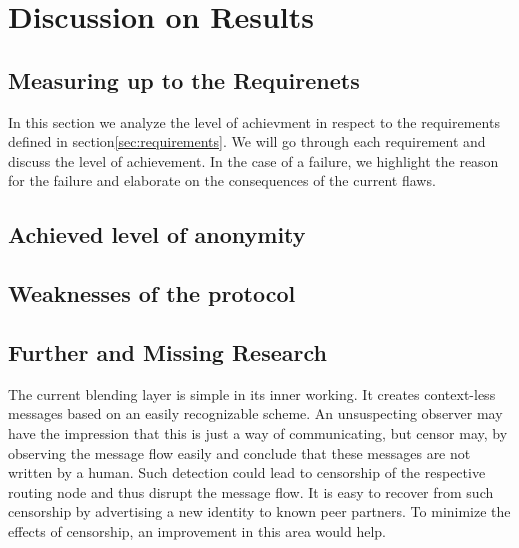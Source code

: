 \part{Discussion on Results}

\chapter{Measuring up to the Requirenets\label{sec:reqDiscussion}}
In this section we analyze the level of achievment in respect to the requirements defined in section\ref{sec:requirements}. We will go through each requirement and discuss the level of achievement. In the case of a failure, we highlight the reason for the failure and elaborate on the consequences of the current flaws.



\chapter{Achieved level of anonymity}

\chapter{Weaknesses of the protocol}

\chapter{Further and Missing Research}
The current blending layer is simple in its inner working. It creates context-less messages based on an easily recognizable scheme. An unsuspecting observer may have the impression that this is just a way of communicating, but censor may, by observing the message flow easily and conclude that these messages are not written by a human. Such detection could lead to censorship of the respective routing node and thus disrupt the message flow. It is easy to recover from such censorship by advertising a new identity to known peer partners. To minimize the effects of censorship, an improvement in this area would help.


